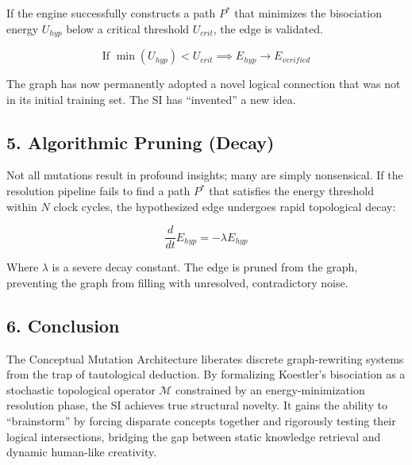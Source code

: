 \documentclass[
  11pt,
  a4paper,
]{article}
\begin{document}
If the engine successfully constructs a path \(P^*\) that minimizes the
bisociation energy \(U_{hyp}\) below a critical threshold \(U_{crit}\),
the edge is validated.

\[ \text{If } \min(U_{hyp}) < U_{crit} \implies E_{hyp} \to E_{verified} \]

The graph has now permanently adopted a novel logical connection that
was not in its initial training set. The SI has ``invented'' a new idea.

\subsection{5. Algorithmic Pruning
(Decay)}\label{algorithmic-pruning-decay}

Not all mutations result in profound insights; many are simply
nonsensical. If the resolution pipeline fails to find a path \(P^*\)
that satisfies the energy threshold within \(N\) clock cycles, the
hypothesized edge undergoes rapid topological decay:

\[ \frac{d}{dt} E_{hyp} = -\lambda E_{hyp} \]

Where \(\lambda\) is a severe decay constant. The edge is pruned from
the graph, preventing the graph from filling with unresolved,
contradictory noise.

\subsection{6. Conclusion}\label{conclusion}

The Conceptual Mutation Architecture liberates discrete graph-rewriting
systems from the trap of tautological deduction. By formalizing
Koestler's bisociation as a stochastic topological operator
\(\mathcal{M}\) constrained by an energy-minimization resolution phase,
the SI achieves true structural novelty. It gains the ability to
``brainstorm'' by forcing disparate concepts together and rigorously
testing their logical intersections, bridging the gap between static
knowledge retrieval and dynamic human-like creativity.
\end{document}

